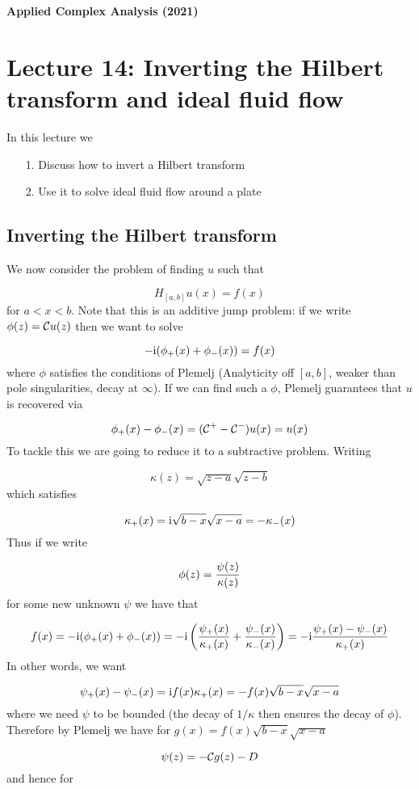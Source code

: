 \documentclass[12pt,a4paper]{article}
\def\I{ {\rm i} }
\def\CC{ {\cal C} }
\begin{document}
\textbf{Applied Complex Analysis (2021)}

\section{Lecture 14: Inverting the Hilbert transform and ideal fluid flow}
In this lecture we

\begin{itemize}
\item[1. ] Discuss how to invert a Hilbert transform


\item[2. ] Use it to solve ideal fluid flow around a plate

\end{itemize}
\subsection{Inverting the Hilbert transform}
We now consider the problem of finding $u$ such that

\[
H_{[a,b]} u(x) = f(x)
\]
for $a < x < b$. Note that this is an additive jump problem: if we write $\phi(z) = \CC u(z)$ then we want to solve

\[
-\I (\phi_+(x) + \phi_-(x)) = f(x)
\]
where $\phi$ satisfies the conditions of Plemelj (Analyticity off $[a,b]$, weaker than pole singularities, decay at $\infty$). If we can find such a $\phi$, Plemelj guarantees that $u$ is recovered via

\[
\phi_+(x) - \phi_-(x) = (\CC^+ - \CC^-)u(x) = u(x)
\]
To tackle this we are going to reduce it to a subtractive problem. Writing

\[
\kappa(z) = \sqrt{z-a} \sqrt{z-b}
\]
which satisfies

\[
\kappa_+(x) = \I \sqrt{b-x} \sqrt{x-a} = -  \kappa_-(x)
\]
Thus if we write

\[
\phi(z) = { \psi(z) \over \kappa(z) }
\]
for some new unknown $\psi$ we have that

\[
f(x) = -\I (\phi_+(x) + \phi_-(x)) = -\I \left({\psi_+(x) \over \kappa_+(x)} + {\psi_-(x) \over \kappa_-(x)}\right) =
-\I {\psi_+(x) - \psi_-(x) \over \kappa_+(x)}
\]
In other words, we want

\[
\psi_+(x) - \psi_-(x) =  \I f(x) \kappa_+(x) = -f(x)\sqrt{b-x}\sqrt{x-a}
\]
where we need $\psi$ to be bounded (the decay of $1/\kappa$ then ensures the decay of $\phi$).  Therefore by Plemelj we have for $g(x) = f(x) \sqrt{b-x} \sqrt{x-a}$

\[
\psi(z) = -\CC g(z) - D
\]
and hence for
\end{document}
